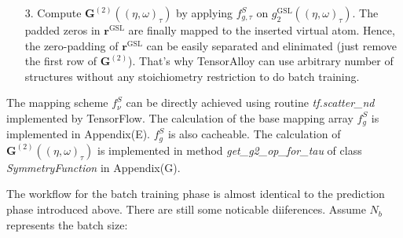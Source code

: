 \documentclass[preprint]{revtex4-2}
\begin{document}
\begin{itemize}
\begin{itemize}
    \end{itemize}
    
    \item[3.]
    Compute $\mathbf{G}^{(2)}((\eta, \omega)_{\tau})$ by applying 
    $f_{g,\tau}^{S}$ on $g^{\mathrm{GSL}}_{2}((\eta, \omega)_{\tau})$. The 
    padded zeros in $\mathbf{r}^{\mathrm{GSL}}$ are finally mapped to the 
    inserted virtual atom. Hence, the zero-padding of 
    $\mathbf{r}^{\mathrm{GSL}}$ can be easily separated and elinimated (just 
    remove the first row of $\mathbf{G}^{(2)}$). That's why TensorAlloy can use
    arbitrary number of structures without any stoichiometry restriction to do 
    batch training.

\end{itemize}

The mapping scheme $f_{\nu}^{S}$ can be directly achieved using routine 
\textit{tf.scatter\_nd} implemented by TensorFlow. The calculation of the base 
mapping array $f_{g}^{S}$ is implemented in Appendix(E). $f_{g}^{S}$ is also 
cacheable. The calculation of $\mathbf{G}^{(2)}((\eta, \omega)_{\tau})$ is 
implemented in method \textit{get\_g2\_op\_for\_tau} of class 
\textit{SymmetryFunction} in Appendix(G).

The workflow for the batch training phase is almost identical to the prediction 
phase introduced above. There are still some noticable diiferences. Assume 
$N_{b}$ represents the batch size:
\end{document}
